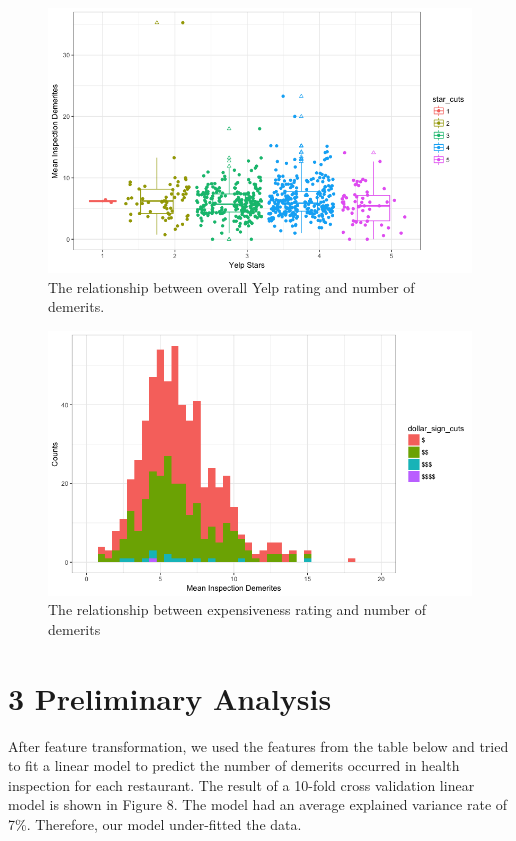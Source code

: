 \documentclass[letterpaper, 11 pt, conference]{ieeeconf}
\begin{document}
\begin{figure}[h]
	\centering
    \includegraphics[scale=0.2]{yelp_star}
    \caption{The relationship between overall Yelp rating and number of demerits.}
\end{figure}

\begin{figure}[h]
	\centering
    \includegraphics[scale=0.28]{dollar_sign}
    \caption{The relationship between expensiveness rating and number of demerits}
\end{figure}

\section*{3 Preliminary Analysis}
	After feature transformation, we used the features from the table below and tried to fit a linear model to predict the number of demerits occurred in health inspection for each restaurant. The result of a 10-fold cross validation linear model is shown in Figure 8. The model had an average explained variance rate of 7\%. Therefore, our model under-fitted the data. 
\end{document}
